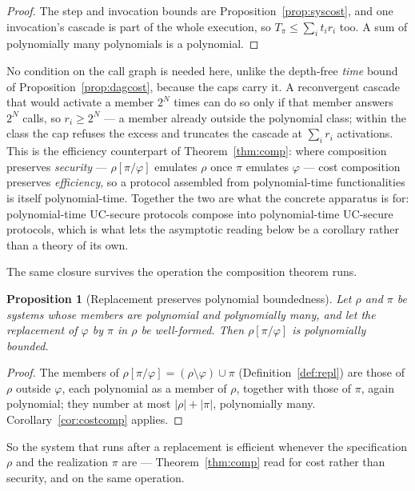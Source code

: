 \documentclass[10pt,oneside,openany]{book}
\theoremstyle{accentdef}
\theoremstyle{accentplain}
\newtheorem{proposition}[definition]{Proposition}
\begin{document}
\begin{proof}
The step and invocation bounds are Proposition~\ref{prop:syscost}, and one invocation's cascade is
part of the whole execution, so $T_\pi \le \sum_i t_i r_i$ too. A sum of polynomially many
polynomials is a polynomial.
\end{proof}

No condition on the call graph is needed here, unlike the depth-free \emph{time} bound of
Proposition~\ref{prop:dagcost}, because the caps carry it. A reconvergent cascade that would
activate a member $2^N$ times can do so only if that member answers $2^N$ calls, so $r_i \ge 2^N$
--- a member already outside the polynomial class; within the class the cap refuses the excess and
truncates the cascade at $\sum_i r_i$ activations. This is the efficiency counterpart of
Theorem~\ref{thm:comp}: where composition preserves \emph{security} --- $\rho[\pi/\varphi]$
emulates $\rho$ once $\pi$ emulates $\varphi$ --- cost composition preserves \emph{efficiency}, so
a protocol assembled from polynomial-time functionalities is itself polynomial-time. Together the
two are what the concrete apparatus is for: polynomial-time UC-secure protocols compose into
polynomial-time UC-secure protocols, which is what lets the asymptotic reading below be a corollary
rather than a theory of its own.

The same closure survives the operation the composition theorem runs.

\begin{proposition}[Replacement preserves polynomial boundedness]\label{prop:replpoly}
Let $\rho$ and $\pi$ be systems whose members are polynomial and polynomially many, and let the
replacement of $\varphi$ by $\pi$ in $\rho$ be well-formed. Then $\rho[\pi/\varphi]$ is
polynomially bounded.
\end{proposition}

\begin{proof}
The members of $\rho[\pi/\varphi] = (\rho \setminus \varphi) \cup \pi$ (Definition~\ref{def:repl})
are those of $\rho$ outside $\varphi$, each polynomial as a member of $\rho$, together with those
of $\pi$, again polynomial; they number at most $\lvert\rho\rvert + \lvert\pi\rvert$, polynomially many.
Corollary~\ref{cor:costcomp} applies.
\end{proof}

So the system that runs after a replacement is efficient whenever the specification $\rho$ and the
realization $\pi$ are --- Theorem~\ref{thm:comp} read for cost rather than security, and on the
same operation.
\end{document}
